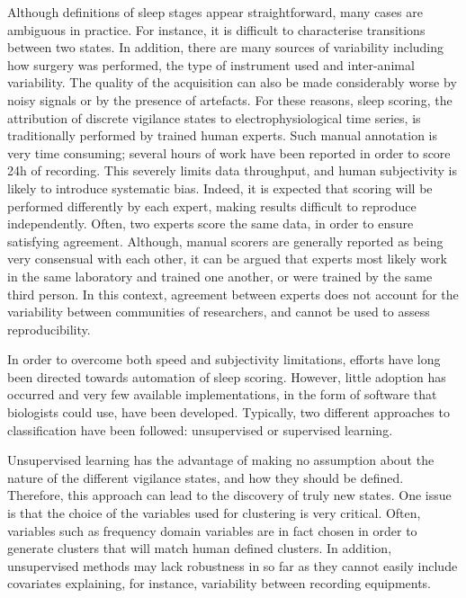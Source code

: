


Although definitions of sleep stages appear straightforward, many cases are ambiguous in practice.
For instance, it is difficult to characterise transitions between two states.
In addition, there are many sources of variability including how surgery was performed, the type of instrument used and inter-animal variability.
The quality of the acquisition can also be made considerably worse by noisy signals or by the presence of artefacts.
For these reasons, sleep scoring, \ie{} the attribution of discrete vigilance states to electrophysiological time series,
is traditionally performed by trained human experts.
Such manual annotation is very time consuming; several hours of work have been reported in order to score 24h of recording\cite{sunagawa_faster:_2013}.
This severely limits data throughput, and human subjectivity is likely to introduce systematic bias.
Indeed, it is expected that scoring will be performed differently by each expert, making results difficult to reproduce independently.
Often, two experts score the same data, in order to ensure satisfying agreement.
Although, manual scorers are generally reported as being very consensual with
each other\cite{costa-miserachs_automated_2003,sen_comparative_2014}, it can be
argued that experts most likely work in the same laboratory and trained one another, or were trained by the same third person.
In this context, agreement between experts does not account for the variability between communities of researchers, and cannot be used to assess reproducibility.

In order to overcome both speed and subjectivity limitations, efforts have long
been directed towards automation of sleep
scoring\cite{chouvet_automatic_1980, haustein_automatic_1986}.
However, little adoption has occurred and very few available implementations, in the form of software that biologists could use, have been developed.
Typically, two different approaches to classification have been followed: unsupervised or supervised learning.

Unsupervised learning \cite{langkvist_sleep_2012,sunagawa_faster:_2013} has the
advantage of making no assumption about the nature of the different vigilance states, and how they should be defined.
Therefore, this approach can lead to the discovery of truly new states.
One issue is that the choice of the variables used for clustering is very
critical.
Often, variables such as frequency domain variables are in fact chosen in order
to generate clusters that will match human defined clusters.
In addition, unsupervised methods may lack robustness\cite{sunagawa_faster:_2013} in so far as they
cannot easily include covariates explaining, for instance, variability between recording equipments.

